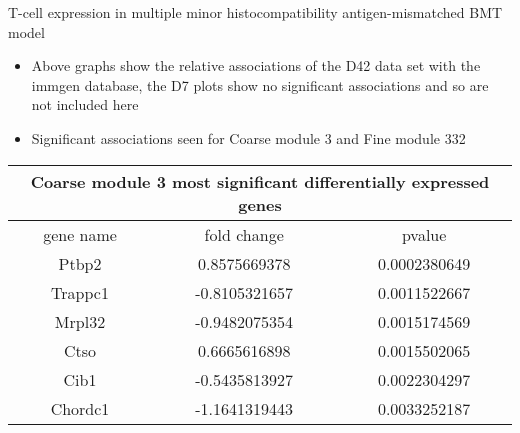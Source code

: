 \documentclass[final,hyperref={pdfpagelabels=false}]{beamer}
\begin{document}
\begin{frame}{}
\begin{columns}[t]
\begin{column}{.24\linewidth}
\begin{block}{T-cell expression in multiple minor histocompatibility antigen-mismatched BMT model}
\begin{minipage}{0.45\textwidth}
          \end{minipage}
{\small          \begin{itemize}
            \item Above graphs show the relative associations of the D42 data set with the immgen database, the D7 plots show no significant associations and so are not included here 
            \item Significant associations seen for Coarse module 3 and Fine module 332 
              \end{itemize}}
 	{\scriptsize    \begin{tabular}{ |c|c|c| } 
	    \hline
	    \multicolumn{3}{|c|}{Coarse module 3 most significant differentially expressed genes} \\
	      \hline
	      gene name & fold change & pvalue \\
	      \hline
	      Ptbp2 & 0.8575669378 & 0.0002380649 \\ %
	      Trappc1 & -0.8105321657 & 0.0011522667 \\ %
	      Mrpl32 & -0.9482075354 & 0.0015174569 \\ %
	      Ctso & 0.6665616898 & 0.0015502065 \\ %
	      Cib1 & -0.5435813927 & 0.0022304297 \\ %
	      Chordc1  & -1.1641319443 & 0.0033252187 \\ %

\end{tabular}}
\end{block}
\end{column}
\end{columns}
\end{frame}
\end{document}

